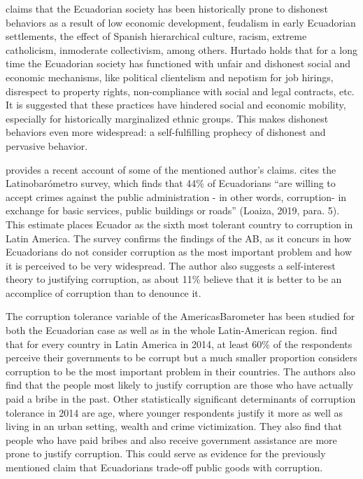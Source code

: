 \documentclass[12pt,a4]{article}\usepackage[]{graphicx}\usepackage[]{xcolor}
\begin{document}
\textcite{Hurtado.2007} claims that the Ecuadorian society has been historically prone to dishonest behaviors as a result of low economic development, feudalism in early Ecuadorian settlements, the effect of Spanish hierarchical culture, racism, extreme catholicism, inmoderate collectivism, among others. Hurtado holds that for a long time the Ecuadorian society has functioned with unfair and dishonest social and economic mechanisms, like political clientelism and nepotism for job hirings, disrespect to property rights, non-compliance with social and legal contracts, etc. It is suggested that these practices have hindered social and economic mobility, especially for historically marginalized ethnic groups. This makes dishonest behaviors even more widespread: a self-fulfilling prophecy of dishonest and pervasive behavior. 

\textcite{Loaiza.2019} provides a recent account of some of the mentioned author's claims. \textcite{Loaiza.2019} cites the Latinobarómetro survey, which finds that 44\% of Ecuadorians \enquote{are willing to accept crimes against the public administration - in other words, corruption- in exchange for basic services, public buildings or roads} (Loaiza, 2019, para. 5). This estimate places Ecuador as the sixth most tolerant country to corruption in Latin America. The survey confirms the findings of the AB, as it concurs in how Ecuadorians do not consider corruption as the most important problem and how it is perceived to be very widespread. The author also suggests a self-interest theory to justifying corruption, as about 11\% believe that it is better to be an accomplice of corruption than to denounce it. 

The corruption tolerance variable of the AmericasBarometer has been studied for both the Ecuadorian case as well as in the whole Latin-American region. \textcite{Singer.2016} find that for every country in Latin America in 2014, at least 60\% of the respondents perceive their governments to be corrupt but a much smaller proportion considers corruption to be the most important problem in their countries. The authors also find that the people most likely to justify corruption are those who have actually paid a bribe in the past. Other statistically significant determinants of corruption tolerance in 2014 are age, where younger respondents justify it more as well as living in an urban setting, wealth and crime victimization. They also find that people who have paid bribes and also receive government assistance are more prone to justify corruption. This could serve as evidence for the previously mentioned claim that Ecuadorians trade-off public goods with corruption.
\end{document}

